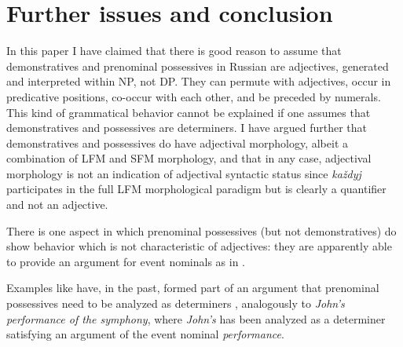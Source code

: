 \documentclass[output=paper,
colorlinks,
citecolor=brown,
newtxmath
]{langscibook}
\begin{document}
\section{Further issues and conclusion}\label{conclusion}

In this paper I have claimed that there is good reason to assume that demonstratives and prenominal possessives in Russian are adjectives, generated and interpreted within NP, not DP. They can permute with adjectives, occur in predicative positions, co-occur with each other, and be preceded by numerals. This kind of grammatical behavior cannot be explained if one assumes that demonstratives and possessives are determiners. I have argued further that demonstratives and possessives do have adjectival morphology, albeit a combination of LFM and SFM morphology, and that in any case, adjectival morphology is not an indication of adjectival syntactic status since \textit{každyj} participates in the full LFM morphological paradigm but is clearly a quantifier and not an adjective.  

There is one aspect in which prenominal possessives (but not demonstratives) do show behavior which is not characteristic of adjectives: they are apparently able to provide an argument for event nominals as in .


\ea\label{42_nedovoltstvo} 
\z\z

\noindent Examples like  have, in the past, formed part of an argument that prenominal possessives need to be analyzed as determiners  \citep[e.g.][]{Babyonyshev1997}, analogously to \textit{John’s performance of the symphony}, where \textit{John’s} has been analyzed as a determiner satisfying an argument of the event nominal \textit{performance}. 
\end{document}
